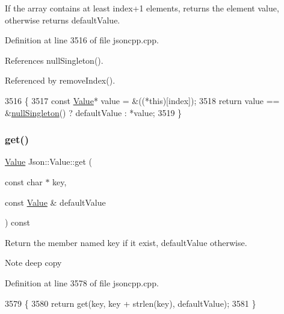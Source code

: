 If the array contains at least index+1 elements, returns the element value, otherwise returns default\+Value. 

Definition at line 3516 of file jsoncpp.\+cpp.



References null\+Singleton().



Referenced by remove\+Index().


\begin{DoxyCode}
3516                                                                   \{
3517   \textcolor{keyword}{const} \hyperlink{class_json_1_1_value_ada6ba1369448fb0240bccc36efaa46f7}{Value}* value = &((*this)[index]);
3518   \textcolor{keywordflow}{return} value == &\hyperlink{class_json_1_1_value_af2f124567acc35d021a424e53ebdfcab}{nullSingleton}() ? defaultValue : *value;
3519 \}
\end{DoxyCode}
\mbox{\label{class_json_1_1_value_a57de86629ed23246f14014fb6c44fa67}} 
\subsubsection{\texorpdfstring{get()}{get()}\hspace{0.1cm}{\footnotesize\ttfamily [2/4]}}
{\footnotesize\ttfamily \hyperlink{class_json_1_1_value}{Value} Json\+::\+Value\+::get (\begin{DoxyParamCaption}\item[{const char $\ast$}]{key,  }\item[{const \hyperlink{class_json_1_1_value}{Value} \&}]{default\+Value }\end{DoxyParamCaption}) const}

Return the member named key if it exist, default\+Value otherwise. \begin{DoxyNote}{Note}
deep copy 
\end{DoxyNote}


Definition at line 3578 of file jsoncpp.\+cpp.


\begin{DoxyCode}
3579 \{
3580   \textcolor{keywordflow}{return} \textcolor{keyword}{get}(key, key + strlen(key), defaultValue);
3581 \}
\end{DoxyCode}
\mbox{\label{class_json_1_1_value_aa59ed050e87e1d58d93671a38687f36c}} 
